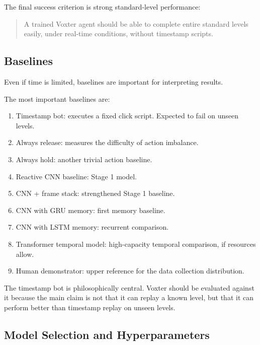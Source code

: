 \documentclass[11pt]{article}
\begin{document}
The final success criterion is strong standard-level performance:
\begin{quote}
A trained Voxter agent should be able to complete entire standard levels easily, under real-time conditions, without timestamp scripts.
\end{quote}

\subsection{Baselines}

Even if time is limited, baselines are important for interpreting results.

The most important baselines are:
\begin{enumerate}
  \item Timestamp bot: executes a fixed click script. Expected to fail on unseen levels.
  \item Always release: measures the difficulty of action imbalance.
  \item Always hold: another trivial action baseline.
  \item Reactive CNN baseline: Stage 1 model.
  \item CNN + frame stack: strengthened Stage 1 baseline.
  \item CNN with GRU memory: first memory baseline.
  \item CNN with LSTM memory: recurrent comparison.
  \item Transformer temporal model: high-capacity temporal comparison, if resources allow.
  \item Human demonstrator: upper reference for the data collection distribution.
\end{enumerate}

The timestamp bot is philosophically central. Voxter should be evaluated against it because the main claim is not that it can replay a known level, but that it can perform better than timestamp replay on unseen levels.

\subsection{Model Selection and Hyperparameters}
\end{document}
